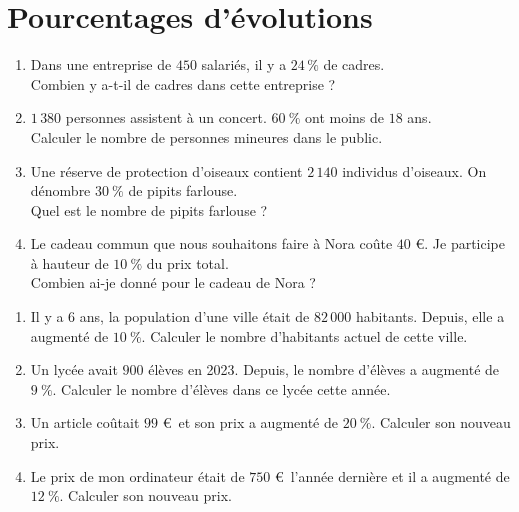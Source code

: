 \documentclass[11pt]{article}
\begin{document}
\section{Pourcentages d'évolutions}

\begin{multicols}{2}{2}
  \begin{exercice}
    \begin{enumerate}
    \item Dans une entreprise de $450$ salariés, il y a $24\,\%$ de
      cadres. \\Combien y a-t-il de cadres dans cette entreprise ?
    \item $1\,380$ personnes assistent à un concert. $60~\%$ ont moins
      de $18$ ans. \\Calculer le nombre de personnes mineures dans le
      public.
    \item Une réserve de protection d'oiseaux contient $2\,140$
      individus d'oiseaux. On dénombre $30~\%$ de pipits
      farlouse.\\Quel est le nombre de pipits farlouse ?
    \item Le cadeau commun que nous souhaitons faire à Nora coûte $40$
      €. Je participe à hauteur de $10~\%$ du prix total. \\Combien
      ai-je donné pour le cadeau de Nora ?
    \end{enumerate}
  \end{exercice}

  \begin{exercice}
    \begin{enumerate}
    \item Il y a 6 ans, la population d'une ville était de $82\,000$
      habitants. Depuis, elle a augmenté de $10~\%$. Calculer le
      nombre d'habitants actuel de cette ville.
    \item Un lycée avait $900$ élèves en 2023. Depuis, le nombre
      d'élèves a augmenté de $9~\%$. Calculer le nombre d'élèves dans
      ce lycée cette année.
    \item Un article coûtait $99$ €~et son prix a augmenté de
      $20~\%$. Calculer son nouveau prix.
    \item Le prix de mon ordinateur était de $750$ €~l'année dernière
      et il a augmenté de $12~\%$. Calculer son nouveau prix.
    \end{enumerate}
  \end{exercice}
\end{multicols}
\end{document}
